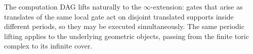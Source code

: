 The computation DAG lifts naturally to the $\infty$-extension: gates that arise as translates of the same local gate act on disjoint translated supports inside different periods, so they may be executed simultaneously. The same periodic lifting applies to the underlying geometric objects, passing from the finite toric complex to its infinite cover.
